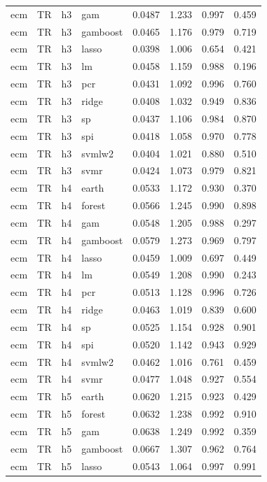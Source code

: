 \begin{ThreePartTable}
\begin{longtable}[t]{llclcccc}
ecm & TR & h3 & gam & 0.0487 & 1.233 & 0.997 & 0.459\\
ecm & TR & h3 & gamboost & 0.0465 & 1.176 & 0.979 & 0.719\\
ecm & TR & h3 & lasso & 0.0398 & 1.006 & 0.654 & 0.421\\
ecm & TR & h3 & lm & 0.0458 & 1.159 & 0.988 & 0.196\\
ecm & TR & h3 & pcr & 0.0431 & 1.092 & 0.996 & 0.760\\
ecm & TR & h3 & ridge & 0.0408 & 1.032 & 0.949 & 0.836\\
ecm & TR & h3 & sp & 0.0437 & 1.106 & 0.984 & 0.870\\
ecm & TR & h3 & spi & 0.0418 & 1.058 & 0.970 & 0.778\\
ecm & TR & h3 & svmlw2 & 0.0404 & 1.021 & 0.880 & 0.510\\
ecm & TR & h3 & svmr & 0.0424 & 1.073 & 0.979 & 0.821\\
\addlinespace
ecm & TR & h4 & earth & 0.0533 & 1.172 & 0.930 & 0.370\\
ecm & TR & h4 & forest & 0.0566 & 1.245 & 0.990 & 0.898\\
ecm & TR & h4 & gam & 0.0548 & 1.205 & 0.988 & 0.297\\
ecm & TR & h4 & gamboost & 0.0579 & 1.273 & 0.969 & 0.797\\
ecm & TR & h4 & lasso & 0.0459 & 1.009 & 0.697 & 0.449\\
ecm & TR & h4 & lm & 0.0549 & 1.208 & 0.990 & 0.243\\
ecm & TR & h4 & pcr & 0.0513 & 1.128 & 0.996 & 0.726\\
ecm & TR & h4 & ridge & 0.0463 & 1.019 & 0.839 & 0.600\\
ecm & TR & h4 & sp & 0.0525 & 1.154 & 0.928 & 0.901\\
ecm & TR & h4 & spi & 0.0520 & 1.142 & 0.943 & 0.929\\
ecm & TR & h4 & svmlw2 & 0.0462 & 1.016 & 0.761 & 0.459\\
ecm & TR & h4 & svmr & 0.0477 & 1.048 & 0.927 & 0.554\\
\addlinespace
ecm & TR & h5 & earth & 0.0620 & 1.215 & 0.923 & 0.429\\
ecm & TR & h5 & forest & 0.0632 & 1.238 & 0.992 & 0.910\\
ecm & TR & h5 & gam & 0.0638 & 1.249 & 0.992 & 0.359\\
ecm & TR & h5 & gamboost & 0.0667 & 1.307 & 0.962 & 0.764\\
ecm & TR & h5 & lasso & 0.0543 & 1.064 & 0.997 & 0.991\\

\end{longtable}
\end{ThreePartTable}
